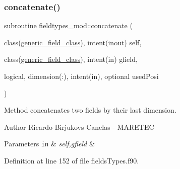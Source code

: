 \subsubsection{\texorpdfstring{concatenate()}{concatenate()}}
{\footnotesize\ttfamily subroutine fieldtypes\+\_\+mod\+::concatenate (\begin{DoxyParamCaption}\item[{class(\mbox{\hyperlink{structfieldtypes__mod_1_1generic__field__class}{generic\+\_\+field\+\_\+class}}), intent(inout)}]{self,  }\item[{class(\mbox{\hyperlink{structfieldtypes__mod_1_1generic__field__class}{generic\+\_\+field\+\_\+class}}), intent(in)}]{gfield,  }\item[{logical, dimension(\+:), intent(in), optional}]{used\+Posi }\end{DoxyParamCaption})\hspace{0.3cm}{\ttfamily [private]}}



Method concatenates two fields by their last dimension. 

\begin{DoxyAuthor}{Author}
Ricardo Birjukovs Canelas -\/ M\+A\+R\+E\+T\+EC 
\end{DoxyAuthor}

\begin{DoxyParams}[1]{Parameters}
\mbox{\tt in}  & {\em self,gfield} & \\
\hline
\end{DoxyParams}


Definition at line 152 of file fields\+Types.\+f90.


